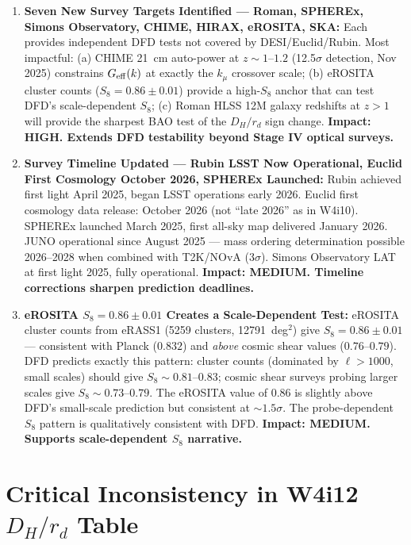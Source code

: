 \documentclass[11pt,a4paper]{article}
\begin{document}
\begin{findbox}
\begin{enumerate}
\item \textbf{Seven New Survey Targets Identified --- Roman, SPHEREx,
  Simons Observatory, CHIME, HIRAX, eROSITA, SKA:}
  Each provides independent DFD tests not covered by DESI/Euclid/Rubin.
  Most impactful: (a) CHIME 21~cm auto-power at $z \sim 1$--$1.2$
  (12.5$\sigma$ detection, Nov 2025) constrains $G_{\rm eff}(k)$
  at exactly the $k_\mu$ crossover scale; (b) eROSITA cluster counts
  ($S_8 = 0.86 \pm 0.01$) provide a high-$S_8$ anchor that can
  test DFD's scale-dependent $S_8$; (c) Roman HLSS 12M galaxy
  redshifts at $z > 1$ will provide the sharpest BAO test of the
  $D_H/r_d$ sign change.
  \textbf{Impact: HIGH. Extends DFD testability beyond Stage IV
  optical surveys.}

\item \textbf{Survey Timeline Updated --- Rubin LSST Now Operational,
  Euclid First Cosmology October 2026, SPHEREx Launched:}
  Rubin achieved first light April 2025, began LSST operations
  early 2026. Euclid first cosmology data release: October 2026
  (not ``late 2026'' as in W4i10). SPHEREx launched March 2025,
  first all-sky map delivered January 2026. JUNO operational since
  August 2025 --- mass ordering determination possible 2026--2028
  when combined with T2K/NOvA ($3\sigma$). Simons Observatory LAT
  at first light 2025, fully operational.
  \textbf{Impact: MEDIUM. Timeline corrections sharpen
  prediction deadlines.}

\item \textbf{eROSITA $S_8 = 0.86 \pm 0.01$ Creates a
  Scale-Dependent Test:}
  eROSITA cluster counts from eRASS1 (5259 clusters, 12791~deg$^2$)
  give $S_8 = 0.86 \pm 0.01$ --- consistent with Planck ($0.832$)
  and \emph{above} cosmic shear values ($0.76$--$0.79$). DFD predicts
  exactly this pattern: cluster counts (dominated by $\ell > 1000$,
  small scales) should give $S_8 \sim 0.81$--$0.83$; cosmic shear
  surveys probing larger scales give $S_8 \sim 0.73$--$0.79$.
  The eROSITA value of 0.86 is slightly above DFD's small-scale
  prediction but consistent at $\sim 1.5\sigma$. The probe-dependent
  $S_8$ pattern is qualitatively consistent with DFD.
  \textbf{Impact: MEDIUM. Supports scale-dependent $S_8$ narrative.}

\end{enumerate}
\end{findbox}

\section{Critical Inconsistency in W4i12 $D_H/r_d$ Table}
\label{sec:inconsistency}
\end{document}
